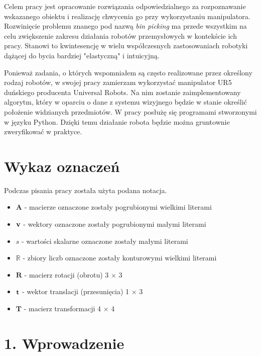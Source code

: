 \documentclass{article}
\begin{document}
Celem pracy jest opracowanie rozwiązania odpowiedzialnego za rozpoznawanie wskazanego obiektu i realizację chwycenia go przy wykorzystaniu manipulatora. Rozwinięcie problemu znanego pod nazwą \emph{bin picking} ma przede wszystkim na celu zwiększenie zakresu działania robotów przemysłowych w kontekście ich pracy. Stanowi to kwintesencję w wielu współczesnych zastosowaniach robotyki dążącej do bycia bardziej "elastyczną" i intuicyjną.

Ponieważ zadania, o których wspomniałem są często realizowane przez określony rodzaj robotów, w swojej pracy zamierzam wykorzystać manipulator UR5 duńskiego producenta Universal Robots. Na nim zostanie zaimplementowany algorytm, który w oparciu o dane z systemu wizyjnego będzie w stanie określić położenie widzianych przedmiotów. W pracy posłużę się programami stworzonymi w języku Python. Dzięki temu działanie robota będzie można gruntownie zweryfikować w praktyce.

\newpage
\tableofcontents

\newpage
\section*{\LARGE{Wykaz oznaczeń}}
Podczas pisania pracy została użyta podana notacja.
\begin{itemize}
\item $\mathbf{A}$ - macierze oznaczone zostały pogrubionymi wielkimi literami
\item $\vb{v}$ - wektory oznaczone zostały pogrubionymi małymi literami
\item $s$ - wartości skalarne oznaczone zostały małymi literami
\item $\mathbb{R}$ - zbiory liczb oznaczone zostały konturowymi wielkimi literami
\item $\mathbf{R}$ - macierz rotacji (obrotu) 3 $\times$ 3
\item $\vb{t}$ - wektor translacji (przesunięcia) 1 $\times$ 3
\item $\mathbf{T}$ - macierz transformacji 4 $\times$ 4
\end{itemize}

\newpage
\section*{\LARGE{1. Wprowadzenie}} 
\end{document}
